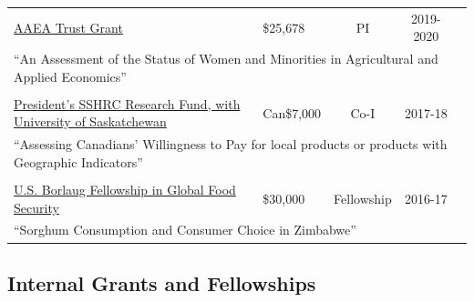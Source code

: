 \documentclass[letterpaper]{article}
\begin{document}
\begin{tabular}{llccc}
\multicolumn{1}{l}{\href{https://www.aaea.org/trust}{AAEA Trust Grant}}	& \$25,678 	& PI			& 2019-2020 \\	
\multicolumn{4}{p{\linewidth}}{``An Assessment of the Status of Women and Minorities in Agricultural and Applied Economics''} \\
&&&& \\
		
\multicolumn{1}{l}{\href{https://www.sshrc-crsh.gc.ca/home-accueil-eng.aspx}{President's SSHRC Research Fund, with University of Saskatchewan}}	& Can\$7,000	& Co-I			& 2017-18 \\	
\multicolumn{4}{p{\linewidth}}{``Assessing Canadians' Willingness to Pay for local products or products with Geographic Indicators''} \\
&&&& \\
		
\multicolumn{1}{l}{\href{https://www.purdue.edu/discoverypark/food/programs/borlaug-fellows/graduate-research-grants.php}{U.S. Borlaug Fellowship in Global Food Security}}	& \$30,000	& Fellowship	& 2016-17 \\
\multicolumn{4}{p{\linewidth}}{``Sorghum Consumption and Consumer Choice in Zimbabwe''} \\

\end{tabular}
	

\subsection*{Internal Grants and Fellowships}
\end{document}
